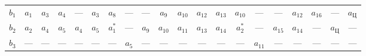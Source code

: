 \begin{figure}
\begin{center}
{\begin{tabular}{|c|c|c|c|c|c|c|c|c|c|c|c|c|c|c|c|c|c|c|c|}
$b_1$&$a_1$&$a_3$&$a_4$&---&$a_3$&$a_8$&---&---&$a_9$&$a_{10}$&$a_{12}$&$a_{13}$&$a_{10}$&---&---&$a_{12}$&$a_{16}$&---&$a_{\mathrm{Ц}}$\\


$b_2$&$a_2$&$a_4$&$a_5$&$a_4$&$a_5$&$a_1^*$&---


&$a_9$&$a_{10}$&$a_{11}$&$a_{13}$&$a_{14}$&$a_2^*$&---&$a_{15}$&$a_{14}$&---&$a_{\mathrm{Ц}}$


&---\\


$b_3$&---&---&---&---&---&---&$a_5$&---&---&---&---&---&---&$a_{11}$&---&---&---&---&---\\


\hline


\end{tabular}


}


\end{center}


\end{figure}







